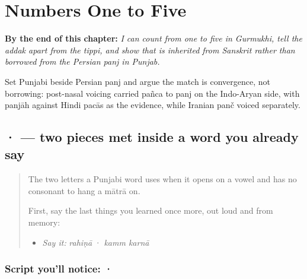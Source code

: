 
\chapter{Numbers One to Five}
\label{ch:numbers-one-to-five}

\begin{chapteropening}
\textbf{By the end of this chapter:} \emph{I can count from one to five in Gurmukhi, tell the addak apart from the tippi, and show that  is inherited from Sanskrit rather than borrowed from the Persian panj in Punjab.}

Set Punjabi  beside Persian panj and argue the match is convergence, not borrowing: post-nasal voicing carried pañca to panj on the Indo-Aryan side, with panjāh against Hindi pacās as the evidence, while Iranian panč voiced separately.
\end{chapteropening}

\section[\texorpdfstring{\pa{ਅ} · \pa{ਆ} (a · ā)}{ਅ · ਆ (a · ā)}]{ ·  — two pieces met inside a word you already say}

\label{lesson:PA-S06-kakka-aira-aara}



\begin{quote}
The two letters a Punjabi word uses when it opens on a vowel and has no consonant to hang a mātrā on.

First, say the last things you learned once more, out loud and from memory:

\begin{itemize}
\raggedright
  \item \emph{Say it:} \emph{rahiṇā} · \emph{kamm karnā}
\end{itemize}
\end{quote}

\subsection*{Script you'll notice:  · }
\begin{quote}
\end{quote}

